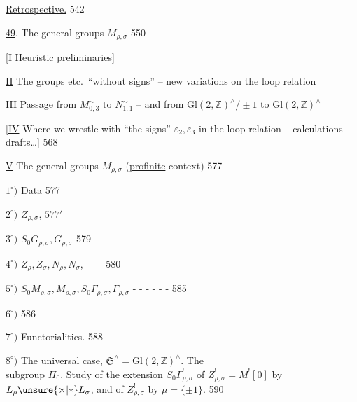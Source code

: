  \uline{Retrospective.} \hfill 542



\uline{49}. The general groups \(M_{\rho,\sigma}\) \hfill 550

[I Heuristic preliminaries]

\uline{II} The groups  etc.\ ``without signs'' -- new
variations on the loop relation \hfill {}

\uline{III} Passage from \(M_{0,3}^{\sim}\) to \(N_{1,1}^{\sim}\) -- and from
\(\mathrm{Gl}(2,\mathbb Z)^{\wedge}/\pm1\) to \(\mathrm{Gl}(2,\mathbb Z)^{\wedge}\) \hfill {}

[\uline{IV} Where we wrestle with ``the signs'' \(\varepsilon_2,\varepsilon_3\)
in the loop relation -- calculations -- drafts\ldots] \hfill 568 

\textcircled{\uline{V}} The general groups \(M_{\rho,\sigma}\)
(\uline{profinite} context) \hfill 577

\(1^{\circ})\) Data \hfill 577

\(2^{\circ})\) \(Z_{\rho,\sigma}\), \unsure{\(\sigma_{\rho,\sigma}\)|\(\delta_{\rho,\sigma}\)} \hfill \(577'\)

\(3^{\circ})\) \(S_0G_{\rho,\sigma},G_{\rho,\sigma}\) \hfill 579

\(4^{\circ})\) \(Z_\rho,Z_\sigma,N_\rho,N_\sigma\),
 \hfill - - - 580

\(5^{\circ})\) \(S_0M_{\rho,\sigma},M_{\rho,\sigma},S_0\Gamma_{\rho,\sigma},\Gamma_{\rho,\sigma}\)
\hfill - - - - - - 585

\(6^{\circ})\) 
\hfill 586

\(7^{\circ})\) Functorialities. \hfill 588

\uline{\(8^{\circ})\)} The universal case, \(\mathfrak S^{\wedge}\)\(=\mathrm{Gl}(2,\mathbb Z)^{\wedge}\). The
\hfill {}\\
 subgroup \(\Pi_0\). Study of the extension
\(S_0\Gamma_{\rho,\sigma}^{!}\) of \(Z_{\rho,\sigma}^{!}=M^{!}[0]\) by
\(L_\rho\unsure{\times|*}L_\sigma\), and  of
\(Z_{\rho,\sigma}^{!}\) by \(\mu=\{\pm1\}\).
\hfill {} 590

